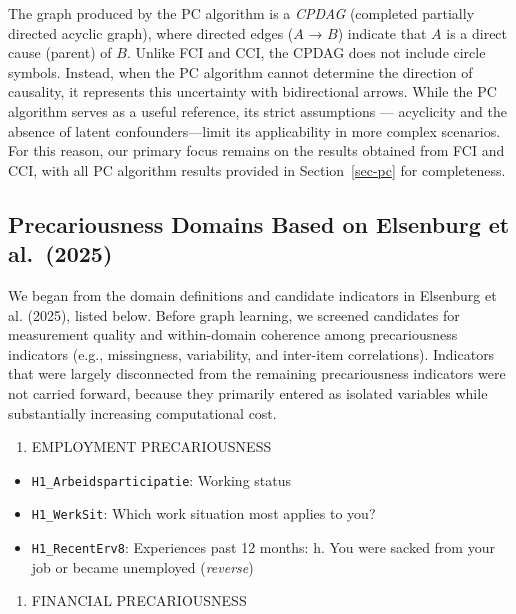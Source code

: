 \documentclass[
]{article}
\providecommand{\tightlist}{%
  \setlength{\itemsep}{0pt}\setlength{\parskip}{0pt}}\usepackage{longtable,booktabs,array}
\begin{document}
The graph produced by the PC algorithm is a \emph{CPDAG} (completed
partially directed acyclic graph), where directed edges (\(A\) → \(B\))
indicate that \(A\) is a direct cause (parent) of \(B\). Unlike FCI and
CCI, the CPDAG does not include circle symbols. Instead, when the PC
algorithm cannot determine the direction of causality, it represents
this uncertainty with bidirectional arrows. While the PC algorithm
serves as a useful reference, its strict assumptions --- acyclicity and
the absence of latent confounders---limit its applicability in more
complex scenarios. For this reason, our primary focus remains on the
results obtained from FCI and CCI, with all PC algorithm results
provided in Section~\ref{sec-pc} for completeness.

\subsection{Precariousness Domains Based on Elsenburg et
al.~(2025)}\label{precariousness-domains-based-on-elsenburg-et-al.-2025}

We began from the domain definitions and candidate indicators in
Elsenburg et al. (2025), listed below. Before graph learning, we
screened candidates for measurement quality and within-domain coherence
among precariousness indicators (e.g., missingness, variability, and
inter-item correlations). Indicators that were largely disconnected from
the remaining precariousness indicators were not carried forward,
because they primarily entered as isolated variables while substantially
increasing computational cost.

\begin{enumerate}
\def\labelenumi{\arabic{enumi}.}
\tightlist
\item
  EMPLOYMENT PRECARIOUSNESS
\end{enumerate}

\begin{itemize}
\tightlist
\item
  \texttt{H1\_Arbeidsparticipatie}: Working status
\item
  \texttt{H1\_WerkSit}: Which work situation most applies to you?
\item
  \texttt{H1\_RecentErv8}: Experiences past 12 months: h. You were
  sacked from your job or became unemployed (\emph{reverse})
\end{itemize}

\begin{enumerate}
\def\labelenumi{\arabic{enumi}.}
\setcounter{enumi}{1}
\tightlist
\item
  FINANCIAL PRECARIOUSNESS
\end{enumerate}
\end{document}

